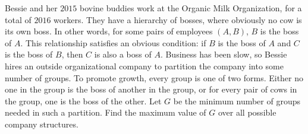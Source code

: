 Bessie and her $2015$ bovine buddies work at the Organic Milk Organization, for a total of $2016$ workers. They have a hierarchy of bosses, where obviously no cow is its own boss. In other words, for some pairs of employees $(A, B)$, $B$ is the boss of $A$. This relationship satisfies an obvious condition: if $B$ is the boss of $A$ and $C$ is the boss of $B$, then $C$ is also a boss of $A$. Business has been slow, so Bessie hires an outside organizational company to partition the company into some number of groups. To promote growth, every group is one of two forms. Either no one in the group is the boss of another in the group, or for every pair of cows in the group, one is the boss of the other. Let $G$ be the minimum number of groups needed in such a partition. Find the maximum value of $G$ over all possible company structures.
